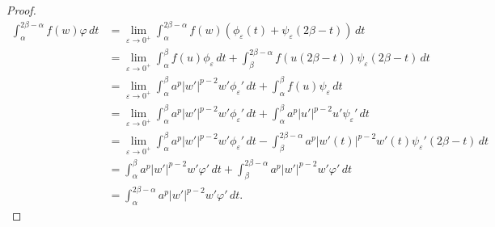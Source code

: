 \documentclass[10pt,a4paper]{amsart}
\begin{document}
\begin{proof}
\begin{align*}
\int_{\alpha}^{2\beta - \alpha} f(w)\varphi \, dt &= \lim_{\varepsilon \to 0^{+}} \int_{\alpha}^{2\beta - \alpha} f(w) \left(\phi_{\varepsilon}(t) + \psi_{\varepsilon}(2\beta - t)\right) \, dt \\
&= \lim_{\varepsilon \to 0^{+}} \int_{\alpha}^{\beta}f(u)\phi_{\varepsilon} \, dt + \int_{\beta}^{2\beta - \alpha} f(u(2\beta - t))\psi_{\varepsilon}(2\beta - t) \, dt \\
&= \lim_{\varepsilon \to 0^{+}}\int_{\alpha}^{\beta} a^{p}|w'|^{p-2} w' \phi_{\varepsilon}' \, dt + \int_{\alpha}^{\beta} f(u) \psi_{\varepsilon} \, dt \\
&= \lim_{\varepsilon \to 0^{+}}\int_{\alpha}^{\beta} a^{p} |w'|^{p-2} w' \phi_{\varepsilon}' \, dt + \int_{\alpha}^{\beta} a^{p}|u'|^{p-2}u'\psi_{\varepsilon}' \, dt \\
&= \lim_{\varepsilon \to 0^{+}}\int_{\alpha}^{\beta} a^{p}|w'|^{p-2} w' \phi_{\varepsilon}' \, dt - \int_{\beta}^{2\beta - \alpha} a^{p} |w'(t)|^{p-2} w'(t) \psi_{\varepsilon}'(2\beta - t) \,dt \\
&= \int_{\alpha}^{\beta} a^{p}|w'|^{p-2} w'\varphi' \, dt + \int_{\beta}^{2\beta - \alpha} a^{p}|w'|^{p-2} w' \varphi' \, dt \\
&= \int_{\alpha}^{2\beta - \alpha} a^{p} |w'|^{p-2} w'\varphi' \, dt.
\end{align*}
\end{proof}
\end{document}
